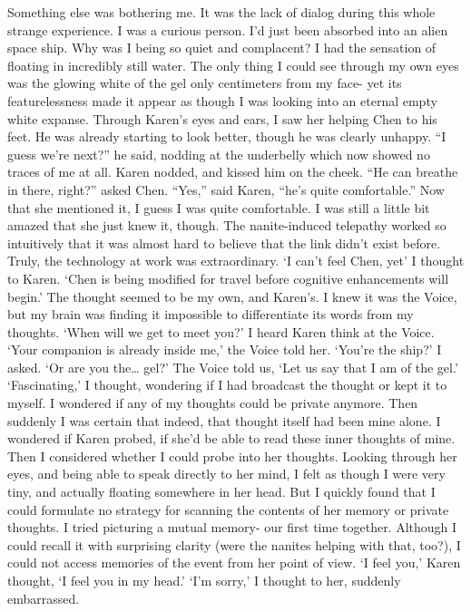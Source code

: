 \documentclass[a4paper]{article}
\begin{document}
Something else was bothering me. It was the lack of dialog during this whole strange experience. I was a curious person. I’d just been absorbed into an alien space ship. Why was I being so quiet and complacent?
I had the sensation of floating in incredibly still water. The only thing I could see through my own eyes was the glowing white of the gel only centimeters from my face- yet its featurelessness made it appear as though I was looking into an eternal empty white expanse.
Through Karen’s eyes and ears, I saw her helping Chen to his feet. He was already starting to look better, though he was clearly unhappy. “I guess we’re next?” he said, nodding at the underbelly which now showed no traces of me at all.
Karen nodded, and kissed him on the cheek.
“He can breathe in there, right?” asked Chen.
“Yes,” said Karen, “he’s quite comfortable.”
Now that she mentioned it, I guess I was quite comfortable. I was still a little bit amazed that she just knew it, though. The nanite-induced telepathy worked so intuitively that it was almost hard to believe that the link didn’t exist before. Truly, the technology at work was extraordinary.
‘I can’t feel Chen, yet’ I thought to Karen.
‘Chen is being modified for travel before cognitive enhancements will begin.’ The thought seemed to be my own, and Karen’s. I knew it was the Voice, but my brain was finding it impossible to differentiate its words from my thoughts.
‘When will we get to meet you?’ I heard Karen think at the Voice.
‘Your companion is already inside me,’ the Voice told her.
‘You’re the ship?’ I asked. ‘Or are you the… gel?’
The Voice told us, ‘Let us say that I am of the gel.’
‘Fascinating,’ I thought, wondering if I had broadcast the thought or kept it to myself. I wondered if any of my thoughts could be private anymore. Then suddenly I was certain that indeed, that thought itself had been mine alone.
I wondered if Karen probed, if she’d be able to read these inner thoughts of mine. Then I considered whether I could probe into her thoughts.
Looking through her eyes, and being able to speak directly to her mind, I felt as though I were very tiny, and actually floating somewhere in her head. But I quickly found that I could formulate no strategy for scanning the contents of her memory or private thoughts.
I tried picturing a mutual memory- our first time together. Although I could recall it with surprising clarity (were the nanites helping with that, too?), I could not access memories of the event from her point of view.
‘I feel you,’ Karen thought, ‘I feel you in my head.’
‘I’m sorry,’ I thought to her, suddenly embarrassed.
\end{document}
